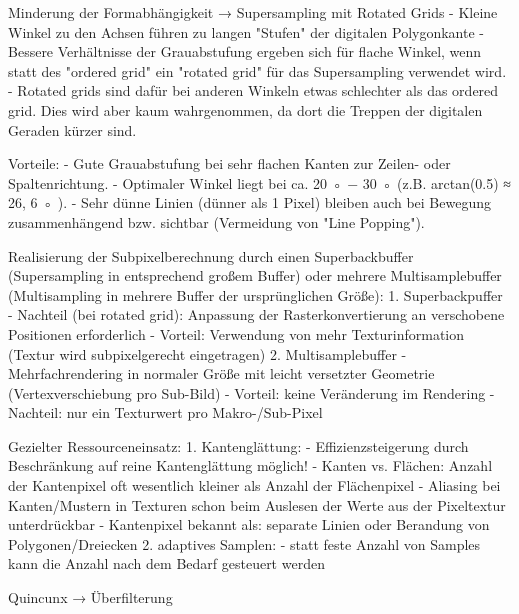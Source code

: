 \documentclass[10pt,landscape]{article}
\begin{document}
\begin{multicols}{3}
Minderung der Formabhängigkeit → Supersampling mit Rotated Grids
- Kleine Winkel zu den Achsen führen zu langen "Stufen" der digitalen Polygonkante
- Bessere Verhältnisse der Grauabstufung ergeben sich für flache Winkel, wenn statt des "ordered grid" ein "rotated grid" für das Supersampling verwendet wird.
- Rotated grids sind dafür bei anderen Winkeln etwas schlechter als das ordered grid. Dies wird aber kaum wahrgenommen, da dort die Treppen der digitalen Geraden kürzer sind.

Vorteile:
- Gute Grauabstufung bei sehr flachen Kanten zur Zeilen- oder Spaltenrichtung.
- Optimaler Winkel liegt bei ca. 20 ◦ − 30 ◦ (z.B. arctan(0.5) ≈ 26, 6 ◦ ).
- Sehr dünne Linien (dünner als 1 Pixel) bleiben auch bei Bewegung zusammenhängend bzw. sichtbar (Vermeidung von "Line Popping").


Realisierung der Subpixelberechnung durch einen Superbackbuffer (Supersampling in entsprechend großem Buffer) oder mehrere Multisamplebuffer (Multisampling in mehrere Buffer der ursprünglichen Größe):
1. Superbackpuffer
    - Nachteil (bei rotated grid): Anpassung der Rasterkonvertierung an verschobene Positionen erforderlich
    - Vorteil: Verwendung von mehr Texturinformation (Textur wird subpixelgerecht eingetragen)
2. Multisamplebuffer
    - Mehrfachrendering in normaler Größe mit leicht versetzter Geometrie (Vertexverschiebung pro Sub-Bild)
    - Vorteil: keine Veränderung im Rendering
    - Nachteil: nur ein Texturwert pro Makro-/Sub-Pixel

Gezielter Ressourceneinsatz:
1. Kantenglättung:
    - Effizienzsteigerung durch Beschränkung auf reine Kantenglättung möglich!
    - Kanten vs. Flächen: Anzahl der Kantenpixel oft wesentlich kleiner als Anzahl der Flächenpixel
    - Aliasing bei Kanten/Mustern in Texturen schon beim Auslesen der Werte aus der Pixeltextur unterdrückbar
    - Kantenpixel bekannt als: separate Linien oder Berandung von Polygonen/Dreiecken
2. adaptives Samplen:
    - statt feste Anzahl von Samples kann die Anzahl nach dem Bedarf gesteuert werden

Quincunx → Überfilterung


\end{multicols}
\end{document}
